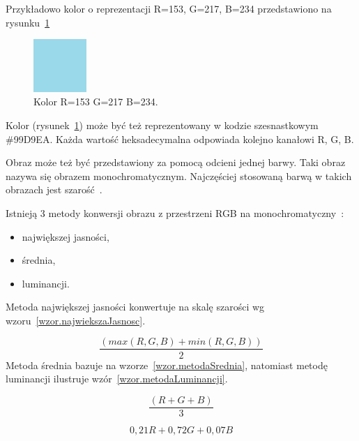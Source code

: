 \documentclass[a4paper,twoside,12pt]{book}
\begin{document}
    Przykładowo kolor o reprezentacji R=153, G=217, B=234 przedstawiono na rysunku~\ref{fig.mieszanieKolorowBlekitny}

    \begin{figure}
        \centering
        \includegraphics[width=2cm]{Obrazy/blekitny.jpg}
        \caption{Kolor R=153 G=217 B=234.}
        \label{fig.mieszanieKolorowBlekitny}
    \end{figure}

    Kolor (rysunek~\ref{fig.mieszanieKolorowBlekitny}) może być też reprezentowany w kodzie szesnastkowym \#99D9EA.
    Każda
    wartość heksadecymalna odpowiada kolejno kanałowi R, G, B.

    Obraz może też być przedstawiony za pomocą odcieni jednej barwy.
    Taki obraz nazywa się obrazem monochromatycznym.
    Najczęściej stosowaną barwą w takich obrazach jest szarość~\cite{przestrzenieKolorow}.

    Istnieją 3 metody konwersji obrazu z przestrzeni RGB na monochromatyczny~\cite{colorMixing}:
    \begin{itemize}
        \item największej jasności,
        \item średnia,
        \item luminancji.
    \end{itemize}
    Metoda największej jasności konwertuje na skalę szarości wg wzoru~\ref{wzor.najwiekszaJasnosc}.

    \large
    \begin{equation}
        \frac{(max(R, G, B) + min(R, G, B))}{2}
        \label{wzor.najwiekszaJasnosc}
    \end{equation}
    \normalsize
    Metoda średnia bazuje na wzorze~\ref{wzor.metodaSrednia}, natomiast metodę luminancji ilustruje wzór~\ref{wzor.metodaLuminancji}.

    \large
    \begin{equation}
        \frac{(R + G + B)}{3}
        \label{wzor.metodaSrednia}
    \end{equation}
    \normalsize

    \large
    \begin{equation}
        0,21 R + 0,72 G + 0,07 B
        \label{wzor.metodaLuminancji}
    \end{equation}
    \normalsize
\end{document}
